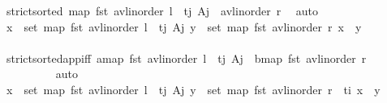 \begin{isabellebody}
\ {\isacartoucheopen}strict{\isacharunderscore}{\kern0pt}sorted\ {\isacharparenleft}{\kern0pt}map\ fst\ {\isacharparenleft}{\kern0pt}avl{\isacharunderscore}{\kern0pt}inorder\ l\ {\isacharat}{\kern0pt}\ {\isacharparenleft}{\kern0pt}t\isactrlsub j{\isacharcomma}{\kern0pt}\ A\isactrlsub j{\isacharparenright}{\kern0pt}\ {\isacharhash}{\kern0pt}\ avl{\isacharunderscore}{\kern0pt}inorder\ r{\isacharparenright}{\kern0pt}{\isacharparenright}{\kern0pt}{\isacartoucheclose}\ \isamarkupfalse%
\ auto\isanewline
\ \ \ \ \ \ \isamarkupfalse%
\ \isamarkupfalse%
\ {\isachardoublequoteopen}{\isasymforall}x\ {\isasymin}\ set\ {\isacharparenleft}{\kern0pt}map\ fst\ {\isacharparenleft}{\kern0pt}avl{\isacharunderscore}{\kern0pt}inorder\ l\ {\isacharat}{\kern0pt}\ {\isacharbrackleft}{\kern0pt}{\isacharparenleft}{\kern0pt}t\isactrlsub j{\isacharcomma}{\kern0pt}\ A\isactrlsub j{\isacharparenright}{\kern0pt}{\isacharbrackright}{\kern0pt}{\isacharparenright}{\kern0pt}{\isacharparenright}{\kern0pt}{\isachardot}{\kern0pt}\ {\isasymforall}y\ {\isasymin}\ set\ {\isacharparenleft}{\kern0pt}map\ fst\ {\isacharparenleft}{\kern0pt}avl{\isacharunderscore}{\kern0pt}inorder\ r{\isacharparenright}{\kern0pt}{\isacharparenright}{\kern0pt}{\isachardot}{\kern0pt}\ x\ {\isacharless}{\kern0pt}\ y{\isachardoublequoteclose}\isanewline
\ \ \ \ \ \ \ \ \isamarkupfalse%
\ strict{\isacharunderscore}{\kern0pt}sorted{\isacharunderscore}{\kern0pt}app{\isacharunderscore}{\kern0pt}iff{\isacharbrackleft}{\kern0pt}\ a{\isacharequal}{\kern0pt}{\isachardoublequoteopen}map\ fst\ {\isacharparenleft}{\kern0pt}avl{\isacharunderscore}{\kern0pt}inorder\ l\ {\isacharat}{\kern0pt}\ {\isacharbrackleft}{\kern0pt}{\isacharparenleft}{\kern0pt}t\isactrlsub j{\isacharcomma}{\kern0pt}\ A\isactrlsub j{\isacharparenright}{\kern0pt}{\isacharbrackright}{\kern0pt}{\isacharparenright}{\kern0pt}{\isachardoublequoteclose}\ \ b{\isacharequal}{\kern0pt}{\isachardoublequoteopen}map\ fst\ {\isacharparenleft}{\kern0pt}avl{\isacharunderscore}{\kern0pt}inorder\ r{\isacharparenright}{\kern0pt}{\isachardoublequoteclose}{\isacharbrackright}{\kern0pt}\ \isanewline
\ \ \ \ \ \ \ \ \isamarkupfalse%
\ auto\isanewline
\ \ \ \ \ \ \isamarkupfalse%
\ \isamarkupfalse%
\ {\isachardoublequoteopen}{\isasymforall}x\ {\isasymin}\ set\ {\isacharparenleft}{\kern0pt}map\ fst\ {\isacharparenleft}{\kern0pt}avl{\isacharunderscore}{\kern0pt}inorder\ l\ {\isacharat}{\kern0pt}\ {\isacharbrackleft}{\kern0pt}{\isacharparenleft}{\kern0pt}t\isactrlsub j{\isacharcomma}{\kern0pt}\ A\isactrlsub j{\isacharparenright}{\kern0pt}{\isacharbrackright}{\kern0pt}{\isacharparenright}{\kern0pt}{\isacharparenright}{\kern0pt}{\isachardot}{\kern0pt}\ {\isasymforall}y\ {\isasymin}\ set\ {\isacharparenleft}{\kern0pt}map\ fst\ {\isacharparenleft}{\kern0pt}avl{\isacharunderscore}{\kern0pt}inorder\ r{\isacharparenright}{\kern0pt}{\isacharparenright}{\kern0pt}\ {\isasymunion}\ {\isacharbraceleft}{\kern0pt}t\isactrlsub i{\isacharbraceright}{\kern0pt}{\isachardot}{\kern0pt}\ x\ {\isacharless}{\kern0pt}\ y{\isachardoublequoteclose}\isanewline

\end{isabellebody}
